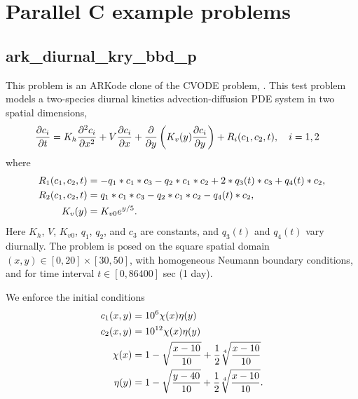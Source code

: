 \documentclass[letterpaper,10pt,english]{sphinxmanual}
\begin{document}
\chapter{Parallel C example problems}
\label{c_parallel::doc}\label{c_parallel:parallel-c-example-problems}\label{c_parallel:parallel-c}

\section{ark\_diurnal\_kry\_bbd\_p}
\label{c_parallel:ark-diurnal-kry-bbd-p}\label{c_parallel:id1}
This problem is an ARKode clone of the CVODE problem,
.  This test problem models a two-species
diurnal kinetics advection-diffusion PDE system in two spatial
dimensions,
\begin{gather}
\begin{split}\frac{\partial c_i}{\partial t} &=
  K_h \frac{\partial^2 c_i}{\partial x^2} +
  V \frac{\partial     c_i}{\partial x} +
  \frac{\partial}{\partial y}\left( K_v(y)
  \frac{\partial c_i}{\partial y}\right) +
  R_i(c_1,c_2,t),\quad i=1,2\end{split}\notag
\end{gather}
where
\begin{gather}
\begin{split}R_1(c_1,c_2,t) &= -q_1*c_1*c_3 - q_2*c_1*c_2 + 2*q_3(t)*c_3 + q_4(t)*c_2, \\
R_2(c_1,c_2,t) &=  q_1*c_1*c_3 - q_2*c_1*c_2 - q_4(t)*c_2, \\
K_v(y) &= K_{v0} e^{y/5}.\end{split}\notag
\end{gather}
Here $K_h$, $V$, $K_{v0}$, $q_1$, $q_2$,
and $c_3$ are constants, and $q_3(t)$ and $q_4(t)$
vary diurnally.  The problem is posed on the square spatial domain
$(x,y) \in [0,20]\times[30,50]$, with homogeneous Neumann
boundary conditions, and for time interval $t\in [0,86400]$ sec
(1 day).

We enforce the initial conditions
\begin{gather}
\begin{split}c_1(x,y) &=  10^6 \chi(x)\eta(y) \\
c_2(x,y) &=  10^{12} \chi(x)\eta(y) \\
\chi(x) &= 1 - \sqrt{\frac{x - 10}{10}} + \frac12 \sqrt[4]{\frac{x - 10}{10}} \\
\eta(y) &= 1 - \sqrt{\frac{y - 40}{10}} + \frac12 \sqrt[4]{\frac{x - 10}{10}}.\end{split}\notag
\end{gather}
\end{document}
